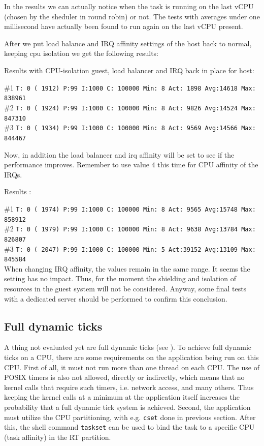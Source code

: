 \documentclass[]{scrartcl}
\begin{document}
In the results we can actually notice when the task is running on the last vCPU (chosen by the sheduler in round robin) or not. The tests with averages under one millisecond have actually been found to run again on the last vCPU present. 

After we put load balance and IRQ affinity settings of the host back to normal, keeping cpu isolation we get the following results:

\bigskip

\noindent Results with CPU-isolation guest, load balancer and IRQ back in place for host:

\noindent \#1 \small \texttt{T: 0 ( 1912) P:99 I:1000 C: 100000 Min:      8 Act: 1898 Avg:14618 Max:  838961}\\
\noindent \#2 \small \texttt{T: 0 ( 1924) P:99 I:1000 C: 100000 Min:      8 Act: 9826 Avg:14524 Max:  847310}\\
\noindent \#3 \small \texttt{T: 0 ( 1934) P:99 I:1000 C: 100000 Min:      8 Act: 9569 Avg:14566 Max:  844467}

Now, in addition the load balancer and irq affinity will be set to see if the performance improves. Remember to use value 4 this time for CPU affinity of the IRQs.
\bigskip

\noindent Results :

\noindent \#1 \small \texttt{T: 0 ( 1974) P:99 I:1000 C: 100000 Min:      8 Act: 9565 Avg:15748 Max:  858912}\\
\noindent \#2 \small \texttt{T: 0 ( 1979) P:99 I:1000 C: 100000 Min:      8 Act: 9638 Avg:13784 Max:  826807}\\
\noindent \#3 \small \texttt{T: 0 ( 2047) P:99 I:1000 C: 100000 Min:      5 Act:39152 Avg:13109 Max:  845584}\\

When changing IRQ affinity, the values remain in the same range. It seems the setting has no impact. Thus, for the moment the shielding and isolation of resources in the guest system will not be considered. 
Anyway, some final tests with a dedicated server should be performed to confirm this conclusion.

\subsection{Full dynamic ticks}

A thing not evaluated yet are full dynamic ticks (see \cite{lrt02}). To achieve full dynamic ticks on a CPU, there are some requirements on the application being run on this CPU. First of all, it must not run more than one thread on each CPU. The use of POSIX timers is also not allowed, directly or indirectly, which means that no kernel calls that require such timers, i.e. network access, and many others. Thus keeping the kernel calls at a minimum at the application itself increases the probability that a full dynamic tick system is achieved.
Second, the application must utilize the CPU partitioning, with e.g. \texttt{cset} done in previous section. After this, the shell command \texttt{taskset} can be used to bind the task to a specific CPU (task affinity) in the RT partition.
\end{document}
